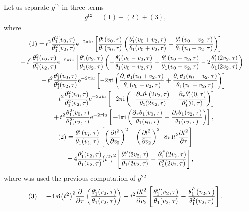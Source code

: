 \documentclass[pdftex]{sigma}%
\numberwithin{equation}{section}
\begin{document}
Let us separate $g^{12}$ in three terms
\begin{gather*}
g^{12}=(1)+(2)+(3),
\end{gather*}
where
\begin{gather*}
(1)=t^2\frac{\theta_1^2(v_0,\tau)}{\theta_1^2(v_2,\tau)}{\rm e}^{-2\pi {\rm i} u}\left[\frac{\theta_1^{\prime}(v_0,\tau)}{\theta_1(v_0,\tau)} \left(\frac{\theta_1^{\prime}(v_0+v_2,\tau)}{\theta_1(v_0+v_2,\tau)} +\frac{\theta_1^{\prime}(v_0-v_2,\tau)}{\theta_1(v_0-v_2,\tau)}\right)\right]
\\ \hphantom{(1)=}
{}+t^2\frac{\theta_1^2(v_0,\tau)}{\theta_1^2(v_2,\tau)}{\rm e}^{-2\pi {\rm i} u}\left[\frac{\theta_1^{\prime}(v_2,\tau)}{\theta_1(v_2,\tau)} \left( - \frac{\theta_1^{\prime}(v_0-v_2,\tau)}{\theta_1(v_0-v_2,\tau)} +\frac{\theta_1^{\prime}(v_0+v_2,\tau)}{\theta_1(v_0+v_2,\tau)} -2\frac{\theta_1^{\prime}(2v_2,\tau)}{\theta_1(2v_2,\tau)}\right)\right]
\\ \hphantom{(1)=}
{}+t^2\frac{\theta_1^2(v_0,\tau)}{\theta_1^2(v_2,\tau)}{\rm e}^{-2\pi {\rm i} u}\left[ - 2\pi {\rm i}\left(\frac{\partial_{\tau}\theta_1(v_0+v_2,\tau)}{\theta_1(v_0+v_2,\tau)} +\frac{\partial_{\tau}\theta_1(v_0-v_2,\tau)}{\theta_1(v_0-v_2,\tau)}\right)\right]
\\ \hphantom{(1)=}
{}+t^2\frac{\theta_1^2(v_0,\tau)}{\theta_1^2(v_2,\tau)}{\rm e}^{-2\pi {\rm i} u}\left[-2\pi {\rm i}\left(-\frac{\partial_{\tau}\theta_1(2v_2,\tau)}{\theta_1(2v_2,\tau)} -\frac{\partial_{\tau}\theta_1^{\prime}(0,\tau)}{\theta_1^{\prime}(0,\tau)}\right)\right]
\\ \hphantom{(1)=}
{}+t^2\frac{\theta_1^2(v_0,\tau)}{\theta_1^2(v_2,\tau)}{\rm e}^{-2\pi {\rm i} u}\left[ - 4\pi {\rm i}\left(\frac{\partial_{\tau}\theta_1(v_0,\tau)}{\theta_1(v_0,\tau)} -\frac{\partial_{\tau}\theta_1(v_2,\tau)}{\theta_1(v_2,\tau)}\right)\right],
\\
(2)=\frac{\theta_1^{\prime}(v_2,\tau)}{\theta_1(v_2,\tau)}
\left[\left(\frac{\partial t^2}{\partial v_0}\right)^2
 - \left(\frac{\partial t^2}{\partial v_2}\right)^2 \!\!\!-8\pi {\rm i}t^2\frac{\partial t^2}{\partial \tau}\right]\\
 \hphantom{(2)}{}
=4\frac{\theta_1^{\prime}(v_2,\tau)}{\theta_1(v_2,\tau)}\big(t^2\big)^2
\left[\frac{\theta_1^{\prime\prime}(2v_2,\tau)}{\theta_1(2v_2,\tau)} -\frac{\theta_1^{\prime^2}(2v_2,\tau)}{\theta_1^2(2v_2,\tau)}\right],
\end{gather*}
where was used the previous computation of $g^{22}$
\begin{gather*}
(3)=-4\pi {\rm i}\big(t^2\big)^2\frac{\partial}{\partial \tau}\left(\frac{\theta_1^{\prime}(v_2,\tau)}{\theta_1(v_2,\tau)}\right)
-t^2\frac{\partial t^2}{\partial v_2}\left[\frac{\theta_1^{\prime\prime}(v_2,\tau)}{\theta_1(v_2,\tau)} -\frac{\theta_1^{\prime^2}(v_2,\tau)}{\theta_1^2(v_2,\tau)}\right].
\end{gather*}
\end{document}
